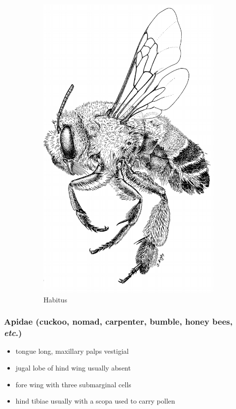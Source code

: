 \documentclass[letterpaper, 11pt]{article}
\begin{document}
\begin{figure}[ht!]
\begin{subfigure}[ht!]{0.32\textwidth}
        \includegraphics[width=\textwidth]{ApidHabitus}
        \caption{Habitus \citep[][Fig. 123]{goulet1993hymenoptera}}
        \label{fig:apid1}
    \end{subfigure}
    \caption{}\label{fig:notused}
\end{figure}

\subsubsection{Apidae (cuckoo, nomad, carpenter, bumble, honey bees, \textit{etc}.)}
\begin{itemize}
\item tongue long, maxillary palps vestigial
\item jugal lobe of hind wing usually absent
\item fore wing with three submarginal cells
\item hind tibiae usually with a scopa used to carry pollen
\end{itemize}
\end{document}
